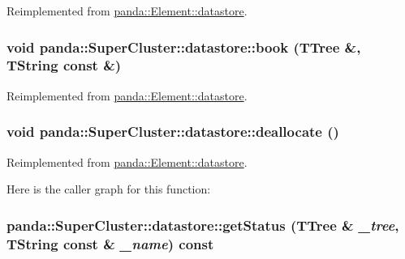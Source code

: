 Reimplemented from \hyperlink{structpanda_1_1Element_1_1datastore_a0397350c92ee5cbf2d16cf66fc701afa}{panda::Element::datastore}.\hypertarget{structpanda_1_1SuperCluster_1_1datastore_a1dbbb1aef2d3af9c2771ad6a21570587}{
\subsubsection[{book}]{\setlength{\rightskip}{0pt plus 5cm}void panda::SuperCluster::datastore::book (TTree \&, \/  TString const \&)}}
\label{structpanda_1_1SuperCluster_1_1datastore_a1dbbb1aef2d3af9c2771ad6a21570587}


Reimplemented from \hyperlink{structpanda_1_1Element_1_1datastore_a2e677f904aee6a53452674b83bea49e4}{panda::Element::datastore}.\hypertarget{structpanda_1_1SuperCluster_1_1datastore_ab60c317f5aa9292d2d8340e38f19a482}{
\subsubsection[{deallocate}]{\setlength{\rightskip}{0pt plus 5cm}void panda::SuperCluster::datastore::deallocate ()}}
\label{structpanda_1_1SuperCluster_1_1datastore_ab60c317f5aa9292d2d8340e38f19a482}


Reimplemented from \hyperlink{structpanda_1_1Element_1_1datastore_aa9b2ee3eacdde38bd77108485678ac86}{panda::Element::datastore}.

Here is the caller graph for this function:\hypertarget{structpanda_1_1SuperCluster_1_1datastore_a24fa9e942bf46eb8d8a6b9499a8ef231}{
\subsubsection[{getStatus}]{ panda::SuperCluster::datastore::getStatus (TTree \& {\em \_\-tree}, \/  TString const \& {\em \_\-name}) const}}
\label{structpanda_1_1SuperCluster_1_1datastore_a24fa9e942bf46eb8d8a6b9499a8ef231}


